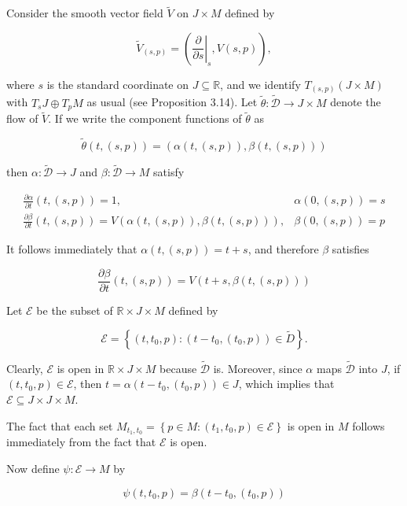 \documentclass[10pt]{article}
\begin{document}
Consider the smooth vector field $\widetilde{V}$ on $J \times M$ defined by

$$
\tilde{V}_{(s, p)}=\left(\left.\frac{\partial}{\partial s}\right|_{s}, V(s, p)\right),
$$

where $s$ is the standard coordinate on $J \subseteq \mathbb{R}$, and we identify $T_{(s, p)}(J \times M)$ with $T_{s} J \oplus T_{p} M$ as usual (see Proposition 3.14). Let $\widetilde{\theta}: \widetilde{\mathscr{D}} \rightarrow J \times M$ denote the flow of $\widetilde{V}$. If we write the component functions of $\widetilde{\theta}$ as

$$
\tilde{\theta}(t,(s, p))=(\alpha(t,(s, p)), \beta(t,(s, p)))
$$

then $\alpha: \widetilde{\mathscr{D}} \rightarrow J$ and $\beta: \widetilde{\mathscr{D}} \rightarrow M$ satisfy

$$
\begin{array}{ll}
\frac{\partial \alpha}{\partial t}(t,(s, p))=1, & \alpha(0,(s, p))=s \\
\frac{\partial \beta}{\partial t}(t,(s, p))=V(\alpha(t,(s, p)), \beta(t,(s, p))), & \beta(0,(s, p))=p
\end{array}
$$

It follows immediately that $\alpha(t,(s, p))=t+s$, and therefore $\beta$ satisfies

$$
\frac{\partial \beta}{\partial t}(t,(s, p))=V(t+s, \beta(t,(s, p)))
$$

Let $\mathscr{E}$ be the subset of $\mathbb{R} \times J \times M$ defined by

$$
\mathcal{E}=\left\{\left(t, t_{0}, p\right):\left(t-t_{0},\left(t_{0}, p\right)\right) \in \widetilde{D}\right\} .
$$

Clearly, $\mathscr{E}$ is open in $\mathbb{R} \times J \times M$ because $\widetilde{\mathscr{D}}$ is. Moreover, since $\alpha$ maps $\widetilde{\mathscr{D}}$ into $J$, if $\left(t, t_{0}, p\right) \in \mathcal{E}$, then $t=\alpha\left(t-t_{0},\left(t_{0}, p\right)\right) \in J$, which implies that $\mathcal{E} \subseteq J \times J \times M$.

The fact that each set $M_{t_{1}, t_{0}}=\left\{p \in M:\left(t_{1}, t_{0}, p\right) \in \mathcal{E}\right\}$ is open in $M$ follows immediately from the fact that $\mathscr{E}$ is open.

Now define $\psi: \mathcal{E} \rightarrow M$ by

$$
\psi\left(t, t_{0}, p\right)=\beta\left(t-t_{0},\left(t_{0}, p\right)\right)
$$
\end{document}
